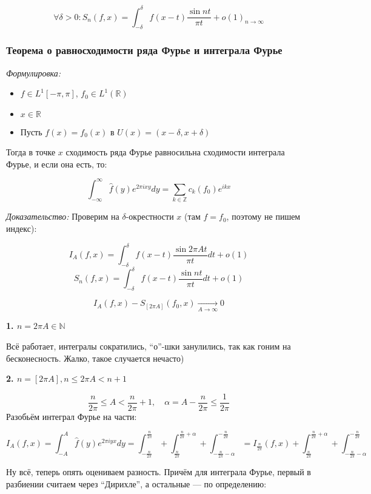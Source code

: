 \documentclass{article}
\def\goesto#1{\underset{#1}{\longrightarrow}}
\begin{document}
\[\forall \delta > 0: S_n(f, x) = \int_{-\delta}^{\delta} f(x - t)\frac{\sin nt}{\pi t} + o(1)_{n \rightarrow \infty}\]

\subsubsection{Теорема о равносходимости ряда Фурье и интеграла Фурье}
\textit{Формулировка:}

\begin{itemize}
    \item $f \in L^1[-\pi, \pi]$, $f_0 \in L^1(\mathbb{R})$
    \item $x \in \mathbb{R}$
    \item Пусть $f(x) = f_0(x)$ в $U(x) = (x - \delta, x + \delta)$
\end{itemize}

Тогда в точке $x$ сходимость ряда Фурье равносильна сходимости интеграла Фурье, и если она есть, то:

\[\int_{-\infty}^{\infty}\hat{f}(y)e^{2 \pi i x y }dy = \sum_{k \in \mathbb{Z}} c_k(f_0) e^{ikx}\]

\textit{Доказательство:}
Проверим на $\delta$-окрестности $x$ (там $f = f_0$, поэтому не пишем индекс):

\[I_A(f, x) = \int_{-\delta}^{\delta}f(x - t)\frac{\sin 2 \pi A t}{\pi t} dt + o(1)\]
\[S_n(f, x) = \int_{-\delta}^{\delta}f(x - t)\frac{\sin n t}{\pi t} dt + o(1)\]


\[I_A(f, x) - S_{[2\pi A]}(f_0, x) \goesto{A \rightarrow \infty} 0\]

\textbf{1. $n = 2 \pi A \in \mathbb{N}$}

Всё работает, интегралы сократились, ``о''-шки занулились, так как гоним на бесконесность. Жалко, такое случается нечасто)

\textbf{2. $n = [2 \pi A], n \le 2\pi A < n + 1$}

\[\frac{n}{2 \pi} \le A < \frac{n}{2\pi} + 1, \quad \alpha = A - \frac{n}{2 \pi} \le \frac{1}{2\pi}\]
Разобьём интеграл Фурье на части:

\[I_A(f, x) = \int_{-A}^{A} \hat{f}(y)e^{2 \pi i y x} dy = \int_{-\frac{n}{2 \pi}}^{\frac{n}{2\pi}} + \int_{\frac{n}{2\pi}}^{\frac{n}{2\pi} + \alpha} + \int_{-\frac{n}{2 \pi} - \alpha}^{-\frac{n}{2 \pi}} = I_{\frac{n}{2\pi}}(f, x) + \int_{\frac{n}{2\pi}}^{\frac{n}{2\pi} + \alpha} + \int_{-\frac{n}{2 \pi} - \alpha}^{-\frac{n}{2 \pi}} \]

Ну всё, теперь опять оцениваем разность. Причём для интеграла Фурье, первый в разбиении считаем через ``Дирихле'', а остальные --- по определению:
\end{document}
